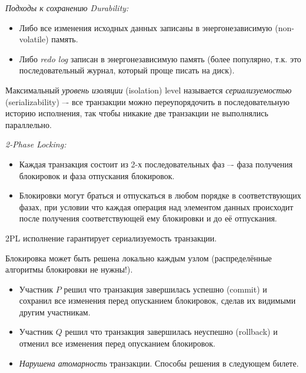 \begin{algorithm} \textit{Подходы к сохранению Durability:}
    \begin{itemize}
        \item Либо все изменения исходных данных записаны в энергонезависимую (non-volatile) память.
        \item Либо \textit{redo log} записан в энергонезависимую память
            (более популярно, т.к. это последовательный журнал, который проще писать на диск).
    \end{itemize}
\end{algorithm}

\begin{definition}
    Максимальный \textit{уровень изоляции} (isolation) level называется
    \textit{сериализуемостью} (serializability) –- все транзакции можно 
    переупорядочить в последовательную историю исполнения, так чтобы никакие 
    две транзакции не выполнялись параллельно.
\end{definition}

\begin{definition} \textit{2-Phase Locking:}
    \begin{itemize}
        \item Каждая транзакция состоит из 2-х последовательных фаз –-
            фаза получения блокировок и фаза отпускания блокировок.
        \item Блокировки могут браться и отпускаться в любом порядке в
            соответствующих фазах, при условии что каждая операция над
            элементом данных происходит после получения соответствующей ему блокировки и до её отпускания.
    \end{itemize}
\end{definition}

\begin{remark}
    2PL исполнение гарантирует сериализуемость транзакции.
\end{remark}

\begin{remark}
    Блокировка может быть решена локально каждым узлом (распределённые алгоритмы 
    блокировки не нужны!).
\end{remark}

\begin{example}
    \enewline
    \begin{itemize}
        \item Участник $P$ решил что транзакция завершилась успешно (commit)
            и сохранил все изменения перед опусканием блокировок, сделав
            их видимыми другим участникам.
        \item Участник $Q$ решил что транзакция завершилась неуспешно
            (rollback) и отменил все изменения перед опусканием блокировок.
        \item \textit{Нарушена атомарность} транзакции. Способы решения в 
            следующем билете.
    \end{itemize}
\end{example}

